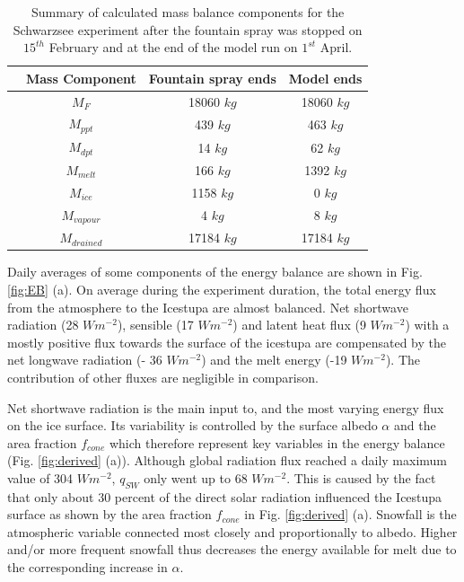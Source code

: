 \documentclass[utf8]{frontiersSCNS} %
\begin{document}
\begin{table} \caption{Summary of calculated mass balance components for the Schwarzsee experiment after the fountain
  spray was stopped on $15^{th}$ February and at the end of the model run on $1^{st}$ April.} \centering
  \begin{tabular}{|c|c|c|c|} \hline & \multicolumn{1}{c|}{Mass Component} & \multicolumn{1}{c|}{Fountain spray ends} &
    \multicolumn{1}{c|}{Model ends} \\ \hline & $M_F$ & 18060 $kg$ & 18060 $kg$\\ \parbox{2mm}{} & $M_{ppt}$ & 439 $kg$ & 463 $kg$\\ & $M_{dpt}$ & 14 $kg$ & 62 $kg$ \\ \hline & $M_{melt}$ & 166 $kg$ &
    1392 $kg$\\ \parbox{2mm}{} & $M_{ice}$ & 1158 $kg$ & 0 $kg$\\ & $M_{vapour}$ & 4
    $kg$ & 8 $kg$\\ & $M_{drained}$ & 17184 $kg$ & 17184 $kg$\\
 
 \hline \end{tabular} \label{table:MB} \end{table}


Daily averages of some components of the energy balance are shown in Fig.  \ref{fig:EB} (a). On average during the
experiment duration, the total energy flux from the atmosphere to the Icestupa are almost balanced. Net shortwave
radiation (28 $Wm^{-2}$), sensible (17 $Wm^{-2}$) and latent heat flux (9 $Wm^{-2}$) with a mostly positive flux towards
the surface of the icestupa are compensated by the net longwave radiation (- 36 $Wm^{-2}$) and the melt energy (-19
$Wm^{-2}$). The contribution of other fluxes are negligible in comparison.

Net shortwave radiation is the main input to, and the most varying energy flux on the ice surface. Its variability is
controlled by the surface albedo $\alpha$ and the area fraction $f_{cone}$ which therefore represent key variables in
the energy balance (Fig. \ref{fig:derived} (a)). Although global radiation flux reached a daily maximum value of 304
$Wm^{-2}$, $q_{SW}$ only went up to 68 $Wm^{-2}$. This is caused by the fact that only about 30 percent of the direct
solar radiation influenced the Icestupa surface as shown by the area fraction $f_{cone}$ in Fig. \ref{fig:derived} (a).
Snowfall is the atmospheric variable connected most closely and proportionally to albedo.  Higher and/or more frequent
snowfall thus decreases the energy available for melt due to the corresponding increase in $\alpha$. 
\end{document}
